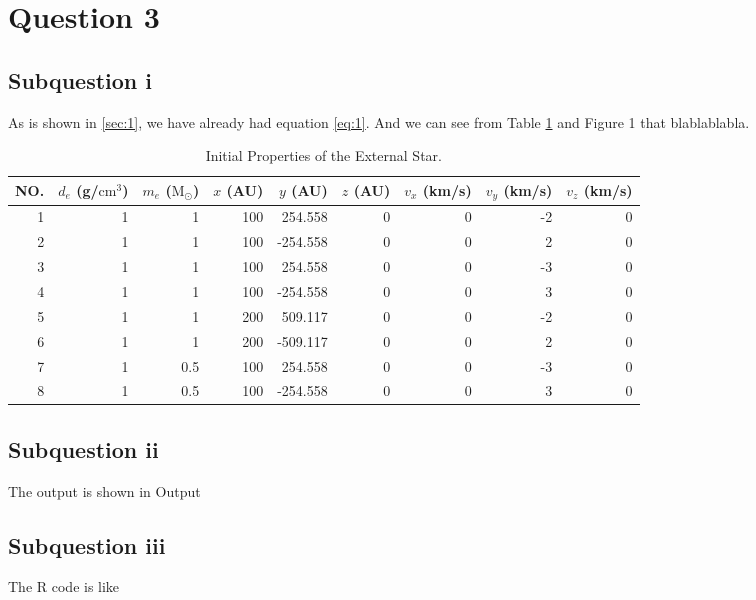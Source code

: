 \documentclass{article}
\DeclareMathOperator{\1}{\mathit{1}}
\numberwithin{figure}{section} %
\begin{document}
\section{Question 3}
\subsection{Subquestion i}
As is shown in \ref{sec:1}, we have already had equation \eqref{eq:1}. And we can see from Table \ref{tab:Parameters_of_Star} and Figure 1 that blablablabla.

	\begin{table}[hbtp]
	\centering
    \caption{\label{tab:Parameters_of_Star}%
    Initial Properties of the External Star.}
    \small
    \begin{tabular}{r|rrrrrrrr}
    \hline\hline
    NO. & $d_e$ (g/$\mathrm{cm}^3$) & $m_e$ ($\mathrm{M}_\odot$) & $x$ (AU) & $y$ (AU) & $z$ (AU) & $v_x$ (km/s) & $v_y$ (km/s) & $v_z$ (km/s) \\ 
    \hline
    1 & 1 & 1 & 100 & 254.558 & 0 & 0 & -2 & 0 \\
    2 & 1 & 1 & 100 & -254.558 & 0 & 0 & 2 & 0 \\
    3 & 1 & 1 & 100 & 254.558 & 0 & 0 & -3 & 0 \\
    4 & 1 & 1 & 100 & -254.558 & 0 & 0 & 3 & 0 \\
    5 & 1 & 1 & 200 & 509.117 & 0 & 0 & -2 & 0 \\
    6 & 1 & 1 & 200 & -509.117 & 0 & 0 & 2 & 0 \\
    7 & 1 & 0.5 & 100 & 254.558 & 0 & 0 & -3 & 0 \\
    8 & 1 & 0.5 & 100 & -254.558 & 0 & 0 & 3 & 0 \\
    \hline\hline
    \end{tabular}
    \end{table}


\subsection{Subquestion ii}
The output is shown in Output 
\subsection{Subquestion iii}

The R code is like
\end{document}
